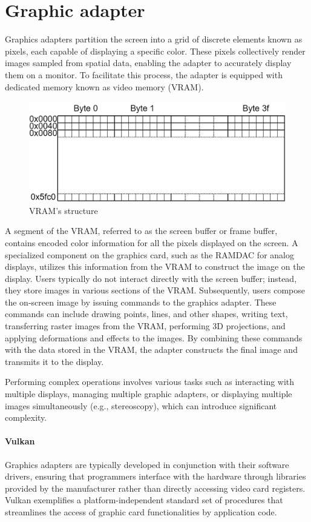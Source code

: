 \section{Graphic adapter}

Graphics adapters partition the screen into a grid of discrete elements known as pixels, each capable of displaying a specific color. 
These pixels collectively render images sampled from spatial data, enabling the adapter to accurately display them on a monitor.
To facilitate this process, the adapter is equipped with dedicated memory known as video memory (VRAM).

\begin{figure}[H]
    \centering
    \includegraphics[width=0.5\linewidth]{images/adapter.png}
    \caption{VRAM's structure}
\end{figure}

A segment of the VRAM, referred to as the screen buffer or frame buffer, contains encoded color information for all the pixels displayed on the screen.
A specialized component on the graphics card, such as the RAMDAC for analog displays, utilizes this information from the VRAM to construct the image on the display.
Users typically do not interact directly with the screen buffer; instead, they store images in various sections of the VRAM.\@
Subsequently, users compose the on-screen image by issuing commands to the graphics adapter.
These commands can include drawing points, lines, and other shapes, writing text, transferring raster images from the VRAM, performing 3D projections, and applying deformations and effects to the images. 
By combining these commands with the data stored in the VRAM, the adapter constructs the final image and transmits it to the display.

Performing complex operations involves various tasks such as interacting with multiple displays, managing multiple graphic adapters, or displaying multiple images simultaneously (e.g., stereoscopy), which can introduce significant complexity.

\paragraph*{Vulkan}
Graphics adapters are typically developed in conjunction with their software drivers, ensuring that programmers interface with the hardware through libraries provided by the manufacturer rather than directly accessing video card registers. 
Vulkan exemplifies a platform-independent standard set of procedures that streamlines the access of graphic card functionalities by application code.
